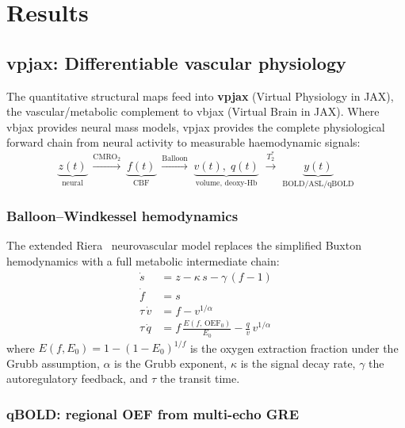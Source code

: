 \documentclass[11pt,a4paper]{article}\usepackage[]{graphicx}\usepackage[]{xcolor}
\begin{document}
\section{Results}

\subsection{vpjax: Differentiable vascular physiology}

The quantitative structural maps feed into \textbf{vpjax} (Virtual
Physiology in JAX), the vascular/metabolic complement to vbjax
(Virtual Brain in JAX). Where vbjax provides neural mass models, vpjax
provides the complete physiological forward chain from neural activity
to measurable haemodynamic signals:
%
\begin{equation}
  \underbrace{z(t)}_{\text{neural}} \;\xrightarrow{\text{CMRO}_2}\;
  \underbrace{f(t)}_{\text{CBF}} \;\xrightarrow{\text{Balloon}}\;
  \underbrace{v(t),\; q(t)}_{\text{volume, deoxy-Hb}} \;\xrightarrow{T_2^*}\;
  \underbrace{y(t)}_{\text{BOLD/ASL/qBOLD}}
\end{equation}

\subsubsection{Balloon--Windkessel hemodynamics}

The extended Riera~\citep{Riera2006neurovascular} neurovascular model
replaces the simplified Buxton hemodynamics with a full metabolic
intermediate chain:
%
\begin{align}
  \dot{s} &= z - \kappa\, s - \gamma\,(f - 1) \label{eq:bw_s}\\
  \dot{f} &= s \label{eq:bw_f}\\
  \tau\,\dot{v} &= f - v^{1/\alpha} \label{eq:bw_v}\\
  \tau\,\dot{q} &= f\,\frac{E(f,\,\text{OEF}_0)}{E_0} - \frac{q}{v}\,v^{1/\alpha}
    \label{eq:bw_q}
\end{align}
%
where $E(f, E_0) = 1 - (1-E_0)^{1/f}$ is the oxygen extraction fraction
under the Grubb assumption, $\alpha$ is the Grubb exponent, $\kappa$ is the
signal decay rate, $\gamma$ the autoregulatory feedback, and $\tau$ the
transit time.

\subsubsection{qBOLD: regional OEF from multi-echo GRE}
\end{document}
